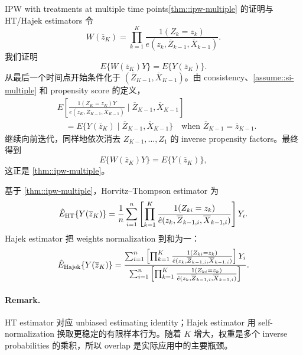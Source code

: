 \begin{exercisesolution}{IPW with treatments at multiple time points}{\cref{thm::ipw-multiple} 的证明与 HT/Hajek estimators}
令
\[
W(\overline z_K)
=
\prod_{k=1}^K
\frac{1(Z_k=z_k)}
{e(z_k,\overline Z_{k-1},\overline X_{k-1})}.
\]
我们证明
\[
E\{W(\overline z_K)Y\}=E\{Y(\overline z_K)\}.
\]
从最后一个时间点开始条件化于 $(\overline Z_{K-1},\overline X_{K-1})$。由 consistency、\cref{assume::si-multiple} 和 propensity score 的定义，
\begin{align*}
&E\left[
\frac{1(Z_K=z_K)Y}
{e(z_K,\overline Z_{K-1},\overline X_{K-1})}
\mid \overline Z_{K-1},\overline X_{K-1}
\right]\\
&\quad =
E\{Y(\overline z_K)\mid \overline Z_{K-1},\overline X_{K-1}\}
\quad\text{when } \overline Z_{K-1}=\overline z_{K-1}.
\end{align*}
继续向前迭代，同样地依次消去 $Z_{K-1},\ldots,Z_1$ 的 inverse propensity factors。最终得到
\[
E\{W(\overline z_K)Y\}=E\{Y(\overline z_K)\},
\]
这正是 \cref{thm::ipw-multiple}。

基于 \cref{thm::ipw-multiple}，Horvitz--Thompson estimator 为
\[
\hat E_{\textup{HT}}\{Y(\overline z_K)\}
=
\frac1n\sum_{i=1}^n
\left[
\prod_{k=1}^K
\frac{1(Z_{ki}=z_k)}
{\hat e(z_k,\overline Z_{k-1,i},\overline X_{k-1,i})}
\right]Y_i.
\]
Hajek estimator 把 weights normalization 到和为一：
\[
\hat E_{\textup{Hajek}}\{Y(\overline z_K)\}
=
\frac{
\sum_{i=1}^n
\left[
\prod_{k=1}^K
\frac{1(Z_{ki}=z_k)}
{\hat e(z_k,\overline Z_{k-1,i},\overline X_{k-1,i})}
\right]Y_i
}{
\sum_{i=1}^n
\left[
\prod_{k=1}^K
\frac{1(Z_{ki}=z_k)}
{\hat e(z_k,\overline Z_{k-1,i},\overline X_{k-1,i})}
\right]
}.
\]

\paragraph{Remark.}
HT estimator 对应 unbiased estimating identity；Hajek estimator 用 self-normalization 换取更稳定的有限样本行为。随着 $K$ 增大，权重是多个 inverse probabilities 的乘积，所以 overlap 是实际应用中的主要瓶颈。
\end{exercisesolution}

